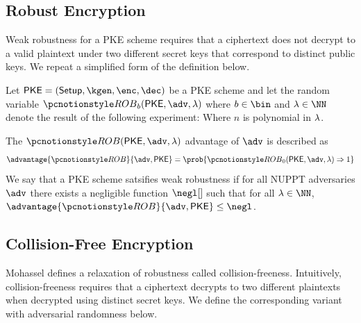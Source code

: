 \subsection{Robust Encryption}

Weak robustness \cite{TCC:AbdBelNev10, AC:Mohassel10} for a PKE scheme requires that a ciphertext does not decrypt to a valid plaintext under two different secret keys that correspond to distinct public keys.
We repeat a simplified form of the definition below.

\begin{definition}
	Let $\pke = (\setup, \kgen, \enc, \dec)$ be a PKE scheme and let the random variable $\robust_b(\pke, \adv, \secpar)$ where $b \in \bin$ and $\secpar \in \NN$ denote the result of the following experiment:
	Where $n$ is polynomial in $\lambda$.

	The $\robust(\pke, \adv, \secpar)$ advantage of $\adv$ is described as
	$$
		\advantage{\robust}{\adv, \pke} = \prob{\robust_0(\pke, \adv, \secpar) \Rightarrow 1}
	$$
	We say that a PKE scheme satsifies weak robustness if for all NUPPT adversaries $\adv$ there exists a negligible function $\negl[]$ such that for all $\secpar \in \NN$, $\advantage{\robust}{\adv, \pke} \leq \negl$.
\end{definition}

\subsection{Collision-Free Encryption}
Mohassel \cite{AC:Mohassel10} defines a relaxation of robustness called collision-freeness.
Intuitively, collision-freeness requires that a ciphertext decrypts to two different plaintexts when decrypted using distinct secret keys.
We define the corresponding variant with adversarial randomness below.


